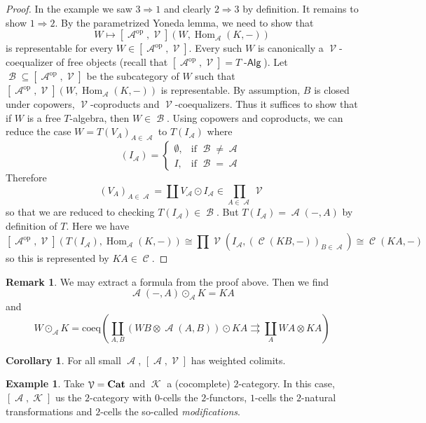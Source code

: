 \documentclass[a4paper,11pt,oneside,openany]{scrbook}
\newcommand{\catname}[1]{{\normalfont\textbf{#1}}}
\DeclareMathOperator{\Alg}{-\mathsf{Alg}}
\newcommand{\Cat}{\catname{Cat}}
\DeclareMathOperator{\Hom}{\text{Hom}}
\DeclareMathOperator{\op}{\text{op}}
\DeclareMathOperator{\K}{\mathcal{K}}
\DeclareMathOperator{\V}{\mathcal{V}}
\DeclareMathOperator{\A}{\mathcal{A}}
\DeclareMathOperator{\B}{\mathcal{B}}
\DeclareMathOperator{\C}{\mathcal{C}}
\DeclareMathOperator{\copw}{\odot}
\theoremstyle{definition}
\theoremstyle{definition}
\newtheorem{cor}[thm]{Corollary}
\newtheorem{rmk}[thm]{Remark}
\newtheorem{exmp}[thm]{Example}
\begin{document}
\begin{proof}
In the example we saw $3\Rightarrow1$ and clearly $2\Rightarrow3$ by definition. It remains to show $1\Rightarrow2$. By the parametrized Yoneda lemma, we need to show that 
$$W\mapsto[\A^{\op},\V](W,\Hom_{\A}(K,-))$$
is representable for every $W\in[\A^{\op},\V]$. Every such $W$ is canonically a $\V$-coequalizer of free objects (recall that $[\A^{\op},\V]=T\Alg$). Let $\B\subseteq[\A^{\op},\V]$ be the subcategory of $W$ such that $[\A^{\op},\V](W,\Hom_{\A}(K,-))$ is representable. By assumption, $B$ is closed under copowers, $\V$-coproducts and $\V$-coequalizers. Thus it suffices to show that if $W$ is a free $T$-algebra, then $W\in\B$. Using copowers and coproducts, we can reduce the case $W=T(V_A)_{A\in\A}$ to $T(I_{\A})$ where 
$$(I_{\A})=\begin{cases} \emptyset, & \mbox{if } \B\ne\A \\ I, & \mbox{if } \B=\A
\end{cases}$$
Therefore $$(V_A)_{A\in\A}=\coprod{V_{\A}\copw I_{\A}}\in\prod_{A\in\A}\V$$
so that we are reduced to checking $T(I_{\A})\in\B$. But $T(I_{\A})=\A(-,A)$ by definition of $T$. Here we have 
$$[\A^{\op},\V](T(I_{\A}),\Hom_{\A}(K,-))\cong\prod\V(I_{\A},(\C(KB,-))_{B\in\A})\cong\C(KA,-)$$
so this is represented by $KA\in\C$.
\end{proof}
\begin{rmk}
   We may extract a formula from the proof above. Then we find $$\A(-,A)\copw_{\A}K=KA$$ and $$W\copw_{\A}K=\text{coeq}\left(\coprod_{A,B}(WB\otimes\A(A,B))\copw KA\rightrightarrows\coprod_{A}WA\otimes KA \right)$$
\end{rmk}
\begin{cor}
    For all small $\A$, $[\A,\V]$ has weighted colimits.
\end{cor}
\begin{exmp}
    Take $\V=\Cat$ and $\K$ a (cocomplete) $2$-category. In this case, $[\A,\K]$ us the $2$-category with $0$-cells the $2$-functors, $1$-cells the $2$-natural transformations and $2$-cells the so-called \emph{modifications}.
\end{exmp}
\end{document}
